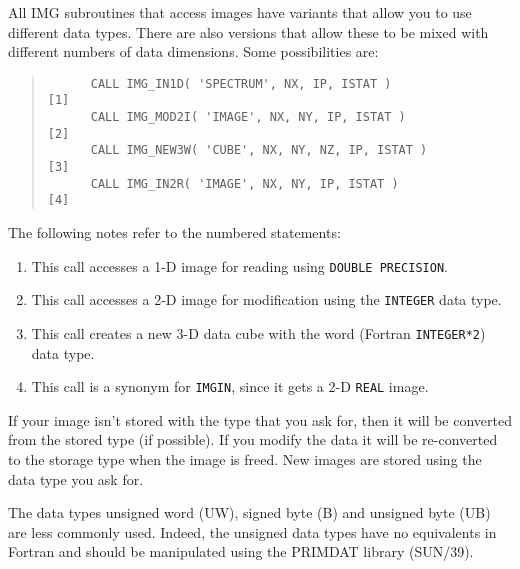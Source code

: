 \documentclass[twoside,11pt]{article}
\newcommand{\htmlref}[2]{#1}
\newcommand{\xref}[3]{#1}
\renewcommand{\_}{\texttt{\symbol{95}}}
\newcommand{\myverb}[1]{{\texttt{#1}}}
\newcommand{\mynote}{The following notes refer to the numbered statements:}
\newenvironment{code}{\begin{small} \begin{quote}}
                     {\end{quote} \end{small}}
\newenvironment{enumnotes}
{
   \renewcommand{\labelenumi}{\myverb{[\theenumi]}}
   \begin{enumerate}
}{
   \end{enumerate}
   \renewcommand{\labelenumi}{\theenumi}
}
\renewenvironment{enumnotes}
  {
    \begin{enumerate}
  }{
    \end{enumerate}
  }
\begin{document}
All IMG subroutines that access images have variants that allow you to
use different data types. There are also versions that allow these to
be mixed with different numbers of data dimensions. Some possibilities
are:
\begin{code}
\begin{verbatim}
      CALL IMG_IN1D( 'SPECTRUM', NX, IP, ISTAT )              [1]
      CALL IMG_MOD2I( 'IMAGE', NX, NY, IP, ISTAT )            [2]
      CALL IMG_NEW3W( 'CUBE', NX, NY, NZ, IP, ISTAT )         [3]
      CALL IMG_IN2R( 'IMAGE', NX, NY, IP, ISTAT )             [4]
\end{verbatim}
\end{code}
\mynote
\begin{enumnotes}
\item This call accesses a 1-D image for reading using \myverb{DOUBLE
PRECISION}.

\item This call accesses a 2-D image for modification using the
\myverb{INTEGER} data type.

\item This call creates a new 3-D data cube with the word (Fortran
\myverb{INTEGER*2}) data type.

\item This call is a synonym for \htmlref{\myverb{IMG\_IN}}{IMG_INnx}, since it gets a 2-D
\myverb{REAL} image.
\end{enumnotes}

If your image isn't stored with the type that you ask for, then it
will be converted from the stored type (if possible). If you modify
the data it will be re-converted to the storage type when the image is
freed.  New images are stored using the data type you ask for.

The data types unsigned word (UW), signed byte (B) and unsigned byte
(UB) are less commonly used. Indeed, the unsigned data types have no
equivalents in Fortran and should be manipulated using the
PRIMDAT library (\xref{SUN/39}{sun39}{}).
\end{document}
